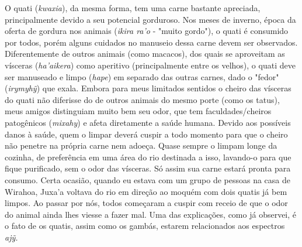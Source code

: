 O quati (\emph{kwaxia}), da mesma forma, tem uma carne bastante
apreciada, principalmente devido a seu potencial gorduroso. Nos meses de
inverno, época da oferta de gordura nos animais (\emph{ikira ra'o} -
"muito gordo"), o quati é consumido por todos, porém alguns cuidados no
manuseio dessa carne devem ser observados. Diferentemente de outros
animais (como macacos), dos quais se aproveitam as vísceras
(\emph{ha'aikera}) como aperitivo (principalmente entre os velhos), o
quati deve ser manuseado e limpo (\emph{hape}) em separado das outras
carnes, dado o "fedor" (\emph{irymyhỹ}) que exala. Embora para meus
limitados sentidos o cheiro das vísceras do quati não diferisse do de
outros animais do mesmo porte (como os tatus), meus amigos distinguiam
muito bem seu odor, que tem faculdades/cheiros patogênicos
(\emph{mixahy}) e afeta diretamente a saúde humana. Devido aos possíveis
danos à saúde, quem o limpar deverá cuspir a todo momento para que o
cheiro não penetre na própria carne nem adoeça. Quase sempre o limpam
longe da cozinha, de preferência em uma área do rio destinada a isso,
lavando-o para que fique purificado, sem o odor das vísceras. Só assim
sua carne estará pronta para consumo. Certa ocasião, quando eu estava
com um grupo de pessoas na casa de Wirahoa, Juxa'a voltava do rio em
direção ao moquém com dois quatis já bem limpos. Ao passar por nós,
todos começaram a cuspir com receio de que o odor do animal ainda lhes
viesse a fazer mal. Uma das explicações, como já observei, é o fato de
os quatis, assim como os gambás, estarem relacionados aos espectros
\emph{ajỹ.}

